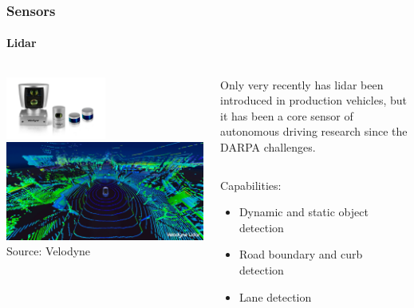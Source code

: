 {\begin{frame}
\frametitle{Sensors}
\framesubtitle{Lidar}
\begin{columns}[T]
    \begin{column}{.5\textwidth}
        \centering
        \includegraphics[width=0.5\textwidth]{images/velodyne_lidars.png}\\
        \vspace{0.2cm}
        \includegraphics[width=\textwidth]{images/velodyne_pointcloud.jpg}\\
        \tiny{Source: Velodyne\footnotemark[1]}
    \end{column}
    \begin{column}{.5\textwidth}
        \footnotesize
        Only very recently has lidar been introduced in production vehicles, but it has
        been a core sensor of autonomous driving research since the DARPA challenges.
        \vspace{0.2cm}
        \begin{columns}[T]
            \begin{column}{0.4\textwidth}
                \footnotesize
                Capabilities:
                \begin{itemize}
                    \item Dynamic and static object detection
                    \item Road boundary and curb detection
                    \item Lane detection

\end{itemize}
\end{column}
\end{columns}
\end{column}
\end{columns}
\end{frame}}
